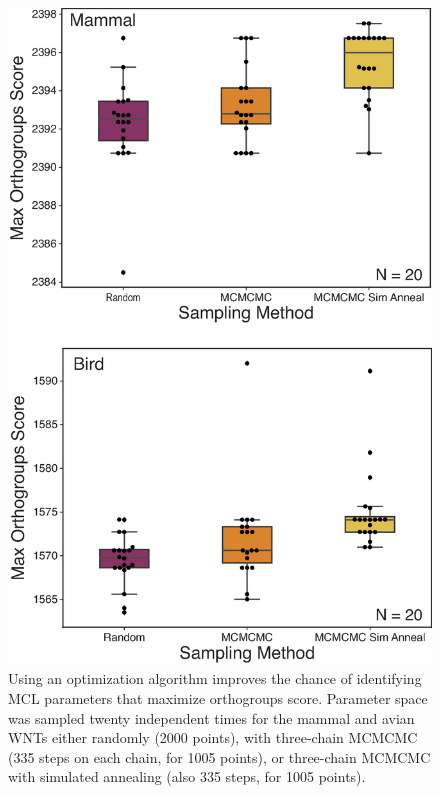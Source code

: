 \documentclass[twocolumn]{bmcart}  %
\begin{document}
\begin{figure}[t]
  \begin{center}
  \includegraphics[height=0.5\textheight]{../figures/random_vs_mcmcmc.eps}
\end{center}
\caption{Using an optimization algorithm improves the chance of identifying MCL parameters that maximize orthogroups score.
Parameter space was sampled twenty independent times for the mammal and avian WNTs either randomly (2000 points), with three-chain MCMCMC (335 steps on each chain, for 1005 points), or three-chain MCMCMC with simulated annealing (also 335 steps, for 1005 points).}
\label{fig:random_vs_mcmcmc}
\end{figure}
\end{document}
